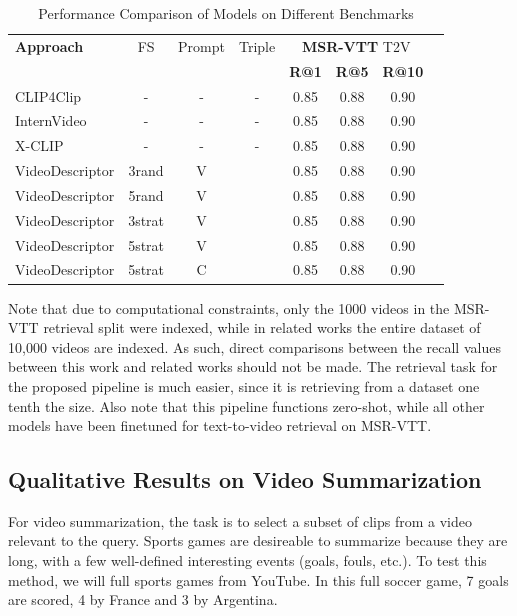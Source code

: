 \documentclass{article}
\begin{document}
\begin{table}[htbp]
  \centering
  \begin{tabular}{lccccccc}
    \toprule
    \textbf{Approach} &FS & Prompt & Triple & \multicolumn{3}{c}{\textbf{MSR-VTT} T2V} \\
    \cmidrule(lr){5-7}
                      &&&& \textbf{R@1} & \textbf{R@5} & \textbf{R@10} \\
    \midrule
    CLIP4Clip &-&-&-& 0.85 & 0.88 & 0.90 \\
    \midrule
    InternVideo &-&-&-& 0.85 & 0.88 & 0.90 \\
    \midrule
    X-CLIP &-&-&-& 0.85 & 0.88 & 0.90 \\
    \bottomrule
    VideoDescriptor &3rand&V& & 0.85 & 0.88 & 0.90 \\
    \midrule
    VideoDescriptor &5rand&V& & 0.85 & 0.88 & 0.90 \\
    \midrule
    VideoDescriptor &3strat&V& & 0.85 & 0.88 & 0.90 \\
    \midrule
    VideoDescriptor &5strat&V& & 0.85 & 0.88 & 0.90 \\
    \midrule
    VideoDescriptor &5strat&C& & 0.85 & 0.88 & 0.90 \\
    \bottomrule
  \end{tabular}
  \label{tab:model_comparison}
  \caption{Performance Comparison of Models on Different Benchmarks}
\end{table}

Note that due to computational constraints, only the 1000 videos in the MSR-VTT retrieval split were indexed, while in related works the entire dataset of 10,000 videos are indexed.
As such, direct comparisons between the recall values between this work and related works should not be made.
The retrieval task for the proposed pipeline is much easier, since it is retrieving from a dataset one tenth the size.
Also note that this pipeline functions zero-shot, while all other models have been finetuned for text-to-video retrieval on MSR-VTT.

\subsection{Qualitative Results on Video Summarization}
For video summarization, the task is to select a subset of clips from a video relevant to the query.
Sports games are desireable to summarize because they are long, with a few well-defined interesting events (goals, fouls, etc.).
To test this method, we will full sports games from YouTube.
In this full soccer game, 7 goals are scored, 4 by France and 3 by Argentina.
\end{document}
